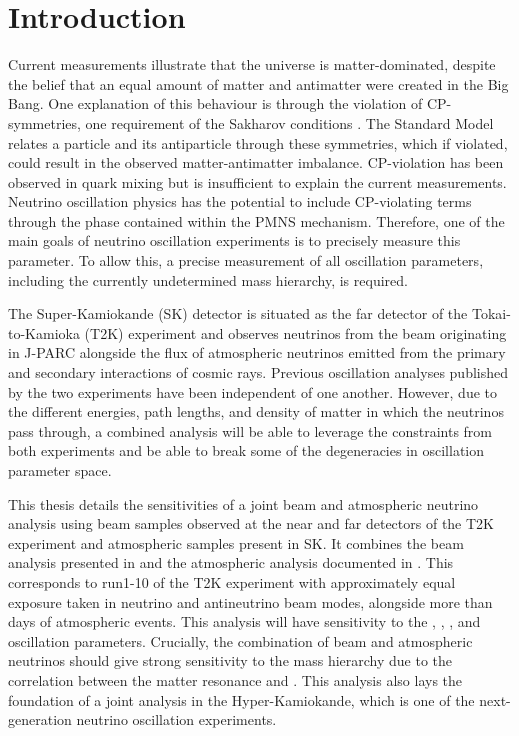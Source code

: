 \chapter{Introduction}
\label{chap:Introduction}

Current measurements illustrate that the universe is matter-dominated, despite the belief that an equal amount of matter and antimatter were created in the Big Bang. One explanation of this behaviour is through the violation of CP-symmetries, one requirement of the Sakharov conditions . The Standard Model relates a particle and its antiparticle through these symmetries, which if violated, could result in the observed matter-antimatter imbalance. CP-violation has been observed in quark mixing  but is insufficient to explain the current measurements. Neutrino oscillation physics has the potential to include CP-violating terms through the  phase contained within the PMNS mechanism. Therefore, one of the main goals of neutrino oscillation experiments is to precisely measure this parameter. To allow this, a precise measurement of all oscillation parameters, including the currently undetermined mass hierarchy, is required.

The Super-Kamiokande (SK) detector is situated as the far detector of the Tokai-to-Kamioka (T2K) experiment and observes neutrinos from the beam originating in J-PARC alongside the flux of atmospheric neutrinos emitted from the primary and secondary interactions of cosmic rays. Previous oscillation analyses published by the two experiments have been independent of one another. However, due to the different energies, path lengths, and density of matter in which the neutrinos pass through, a combined analysis will be able to leverage the constraints from both experiments and be able to break some of the degeneracies in oscillation parameter space.

This thesis details the sensitivities of a joint beam and atmospheric neutrino analysis using beam samples observed at the near and far detectors of the T2K experiment and atmospheric samples present in SK. It combines the beam analysis presented in \cite{Dunne2020-uf} and the atmospheric analysis documented in \cite{Jiang2019-iw}. This corresponds to run1-10 of the T2K experiment with approximately equal exposure taken in neutrino and antineutrino beam modes, alongside more than  days of atmospheric events. This analysis will have sensitivity to the , , , and  oscillation parameters. Crucially, the combination of beam and atmospheric neutrinos should give strong sensitivity to the mass hierarchy due to the correlation between the matter resonance and . This analysis also lays the foundation of a joint analysis in the Hyper-Kamiokande, which is one of the next-generation neutrino oscillation experiments.

